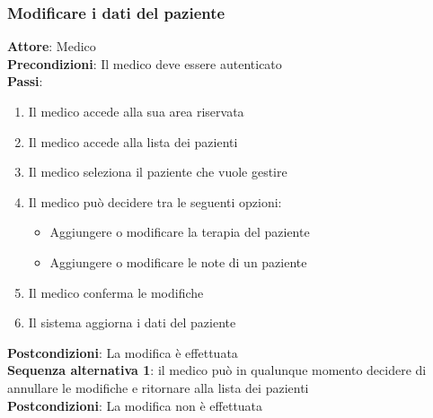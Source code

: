 \documentclass[a4paper]{article}
\begin{document}
\subsubsection{Modificare i dati del paziente}
\begin{mdframed}
  \textbf{Attore}: Medico\\
  \textbf{Precondizioni}: Il medico deve essere autenticato\\
  \textbf{Passi}: 
  \begin{enumerate}[nosep]
    \item Il medico accede alla sua area riservata
    \item Il medico accede alla lista dei pazienti
    \item Il medico seleziona il paziente che vuole gestire
    \item Il medico può decidere tra le seguenti opzioni:
      \begin{itemize}
        \item Aggiungere o modificare la terapia del paziente
        \item Aggiungere o modificare le note di un paziente
      \end{itemize}
    \item Il medico conferma le modifiche
    \item Il sistema aggiorna i dati del paziente
  \end{enumerate}
  \textbf{Postcondizioni}: La modifica è effettuata\\
  \textbf{Sequenza alternativa 1}: il medico può in qualunque momento decidere di annullare le modifiche
  e ritornare alla lista dei pazienti\\
  \textbf{Postcondizioni}: La modifica non è effettuata
\end{mdframed}
\noindent
\end{document}
